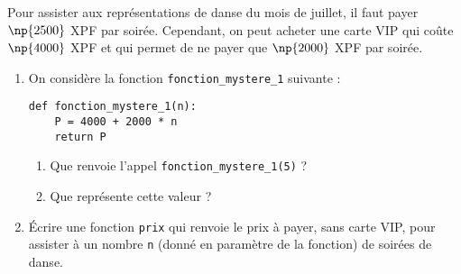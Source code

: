\documentclass[a4paper,dvipsnames]{article}
\begin{document}
\exo[3 points]\vspace{-2mm} Pour assister aux représentations de danse du mois de juillet, il faut payer $\np{2500}$ XPF par soirée. Cependant, on peut acheter une carte VIP qui coûte $\np{4000}$ XPF et qui permet de ne payer que $\np{2000}$ XPF par soirée.
\begin{enumerate}
  \item On considère la fonction \texttt{fonction_mystere_1} suivante :
    \begin{verbatim}
def fonction_mystere_1(n):
    P = 4000 + 2000 * n
    return P
    \end{verbatim}
   \begin{enumerate}
     \item Que renvoie l'appel \texttt{fonction_mystere_1(5)} ?
     \item Que représente cette valeur ?
   \end{enumerate} 
 \item Écrire une fonction \texttt{prix} qui renvoie le prix à payer, sans carte VIP, pour assister à un nombre \texttt{n} (donné en paramètre de la fonction) de soirées de danse.
\end{enumerate}
\end{document}
